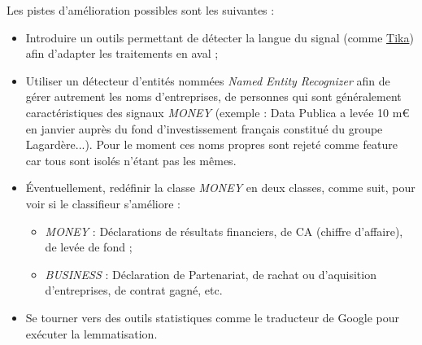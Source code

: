     Les pistes d'amélioration possibles sont les suivantes :
    \begin{itemize}
        \item Introduire un outils permettant de détecter la langue du signal (comme \href{https://tika.apache.org/}{Tika}) afin d'adapter les traitements en aval ;
        \item Utiliser un détecteur d'entités nommées \textit{Named Entity Recognizer} afin de gérer autrement les noms d'entreprises, de personnes qui sont généralement caractéristiques des signaux \textit{MONEY} (exemple : \og Data Publica a levée 10 m€ en janvier auprès du fond d'investissement français constitué du groupe Lagardère...\fg). Pour le moment ces noms propres sont rejeté comme feature car tous sont isolés n'étant pas les mêmes.
        \item Éventuellement, redéfinir la classe \textit{MONEY} en deux classes, comme suit, pour voir si le classifieur s'améliore :
        \begin{itemize}
            \item \textit{MONEY} : Déclarations de résultats financiers, de CA (chiffre d'affaire), de levée de fond ;
            \item \textit{BUSINESS} : Déclaration de Partenariat, de rachat ou d'aquisition d'entreprises, de \og contrat gagné\fg, etc.
        \end{itemize}
        \item Se tourner vers des outils statistiques comme le traducteur de Google pour exécuter la lemmatisation.\\
    \end{itemize}